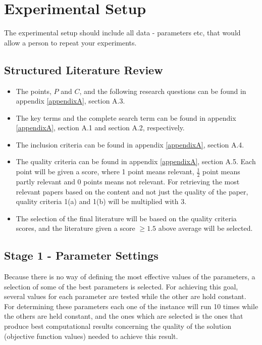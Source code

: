 \section{Experimental Setup}

The experimental setup should include all data - parameters etc, that would allow a person to repeat your experiments. 
 
\subsection{Structured Literature Review}

\begin{itemize}
\item The points, $P$ and $C$, and the following research questions can be found in appendix \ref{appendixA}, section A.3. 
\item The key terms and the complete search term can be found in appendix \ref{appendixA}, section A.1 and section A.2, respectively.
\item The inclusion criteria can be found in appendix \ref{appendixA}, section A.4.
\item The quality criteria can be found in appendix \ref{appendixA}, section A.5. Each point will be given a score, where 1 point means relevant, $\frac{1}{2}$ point means partly relevant and 0 points means not relevant. For retrieving the most relevant papers based on the content and not just the quality of the paper, quality criteria 1(a) and 1(b) will be multiplied with 3.
\item The selection of the final literature will be based on the quality criteria scores, and the literature given a score $\geq{1.5}$ above average will be selected.
\end{itemize}

\subsection{Stage 1 - Parameter Settings}

Because there is no way of defining the most effective values of the parameters, a selection of some of the best parameters is selected. For achieving this goal, several values for each parameter are tested while the other are hold constant. For determining these parameters each one of the instance will run 10 times while the others are held constant, and the ones which are selected is the ones that produce best computational results concerning the quality of the solution (objective function values) needed to achieve this result. 

